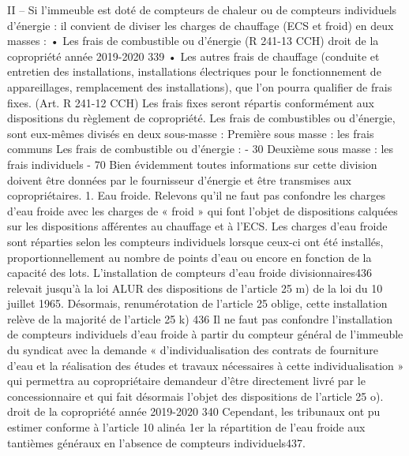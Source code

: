 		II – Si l’immeuble est doté de compteurs de chaleur ou de compteurs individuels d’énergie : il convient de diviser les charges de chauffage (ECS et froid) en deux masses :
		• Les frais de combustible ou d’énergie (R 241-13 CCH)
		droit de la copropriété année 2019-2020
		339
		• Les autres frais de chauffage (conduite et entretien des installations, installations électriques pour le fonctionnement de appareillages, remplacement des installations), que l’on pourra qualifier de frais fixes. (Art. R 241-12 CCH)
		Les frais fixes seront répartis conformément aux dispositions du règlement de copropriété.
		Les frais de combustibles ou d’énergie, sont eux-mêmes divisés en deux sous-masse :
		Première sous masse : les frais communs
		Les frais de combustible ou d’énergie
		:
		- 30 %
		Deuxième sous masse : les frais individuels
		- 70 %
		Bien évidemment toutes informations sur cette division doivent être données par le fournisseur d’énergie et être transmises aux copropriétaires.
		1. Eau froide.
		Relevons qu’il ne faut pas confondre les charges d’eau froide avec les charges de « froid » qui font l’objet de dispositions calquées sur les dispositions afférentes au chauffage et à l’ECS.
		Les charges d'eau froide sont réparties selon les compteurs individuels lorsque ceux-ci ont été installés, proportionnellement au nombre de points d'eau ou encore en fonction de la capacité des lots. L'installation de compteurs d'eau froide divisionnaires436 relevait jusqu’à la loi ALUR des dispositions de l’article 25 m) de la loi du 10 juillet 1965. Désormais, renumérotation de l’article 25 oblige, cette installation relève de la majorité de l’article 25 k)
		436 Il ne faut pas confondre l’installation de compteurs individuels d’eau froide à partir du compteur général de l’immeuble du syndicat avec la demande « d’individualisation des contrats de fourniture d’eau et la réalisation des études et travaux nécessaires à cette individualisation » qui permettra au copropriétaire demandeur d’être directement livré par le concessionnaire et qui fait désormais l’objet des dispositions de l’article 25 o).
		droit de la copropriété année 2019-2020
		340
		Cependant, les tribunaux ont pu estimer conforme à l'article 10 alinéa 1er la répartition de l'eau froide aux tantièmes généraux en l'absence de compteurs individuels437.
